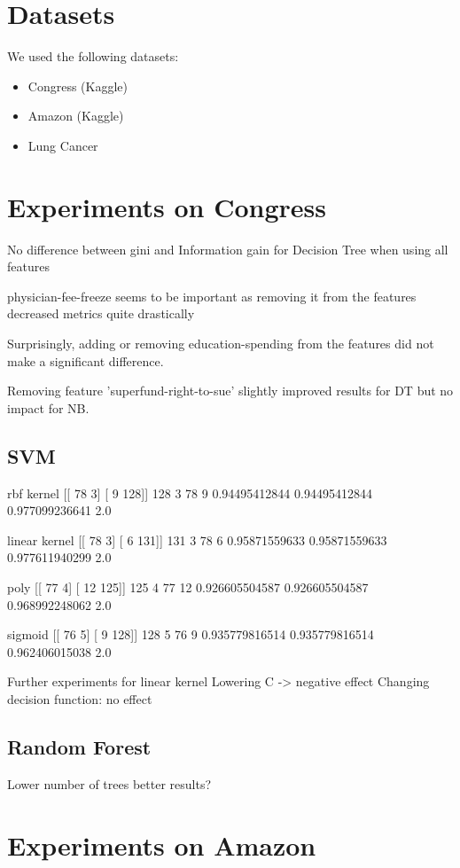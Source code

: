 \section{Datasets}
We used the following datasets:
\begin{itemize}
\item Congress (Kaggle)
\item Amazon (Kaggle)
\item Lung Cancer
\end{itemize}

\section{Experiments on Congress}
No difference between gini and Information gain for Decision Tree when using all features

physician-fee-freeze seems to be important as removing it from the features decreased metrics quite drastically

Surprisingly, adding or removing education-spending from the features did not make a significant difference.

Removing feature 'superfund-right-to-sue' slightly improved results for DT but no impact for NB.

\subsection{SVM}

rbf kernel
[[ 78   3]
 [  9 128]]
128 3 78 9
0.94495412844 0.94495412844 0.977099236641 2.0

linear kernel
[[ 78   3]
 [  6 131]]
131 3 78 6
0.95871559633 0.95871559633 0.977611940299 2.0

poly
[[ 77   4]
 [ 12 125]]
125 4 77 12
0.926605504587 0.926605504587 0.968992248062 2.0

sigmoid
[[ 76   5]
 [  9 128]]
128 5 76 9
0.935779816514 0.935779816514 0.962406015038 2.0

Further experiments for linear kernel
Lowering C -> negative effect
Changing decision function: no effect

\subsection{Random Forest}
Lower number of trees better results?

\section{Experiments on Amazon}
